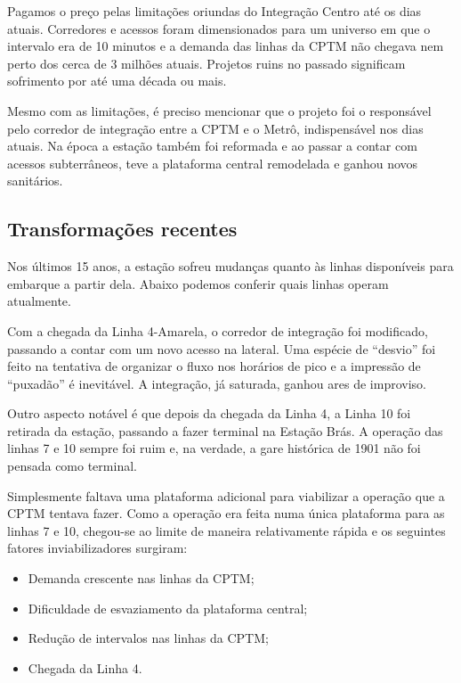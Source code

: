 \documentclass[11pt,fleqn]{book} %
\begin{document}
Pagamos o preço pelas limitações oriundas do Integração Centro até os dias atuais. Corredores e acessos foram dimensionados para um universo em que o intervalo era de 10 minutos e a demanda das linhas da CPTM não chegava nem perto dos cerca de 3 milhões atuais. Projetos ruins no passado significam sofrimento por até uma década ou mais.

Mesmo com as limitações, é preciso mencionar que o projeto foi o responsável pelo corredor de integração entre a CPTM e o Metrô, indispensável nos dias atuais. Na época a estação também foi reformada e ao passar a contar com acessos subterrâneos, teve a plataforma central remodelada e ganhou novos sanitários.

\subsection{Transformações recentes}

Nos últimos 15 anos, a estação sofreu mudanças quanto às linhas disponíveis para embarque a partir dela. Abaixo podemos conferir quais linhas operam atualmente.


Com a chegada da Linha 4-Amarela, o corredor de integração foi modificado, passando a contar com um novo acesso na lateral. Uma espécie de “desvio” foi feito na tentativa de organizar o fluxo nos horários de pico e a impressão de “puxadão” é inevitável. A integração, já saturada, ganhou ares de improviso.

Outro aspecto notável é que depois da chegada da Linha 4, a Linha 10 foi retirada da estação, passando a fazer terminal na Estação Brás. A operação das linhas 7 e 10 sempre foi ruim e, na verdade, a gare histórica de 1901 não foi pensada como terminal.

Simplesmente faltava uma plataforma adicional para viabilizar a operação que a CPTM tentava fazer. Como a operação era feita numa única plataforma para as linhas 7 e 10, chegou-se ao limite de maneira relativamente rápida e os seguintes fatores inviabilizadores surgiram:

\begin{itemize}
	\item Demanda crescente nas linhas da CPTM;
	\item Dificuldade de esvaziamento da plataforma central;
	\item Redução de intervalos nas linhas da CPTM;
	\item Chegada da Linha 4.
\end{itemize}
\end{document}
